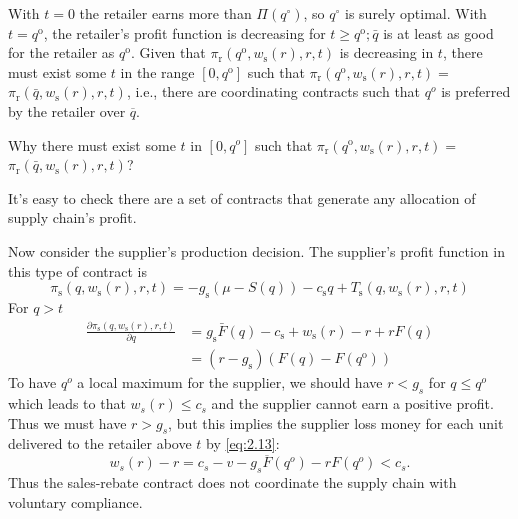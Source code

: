 With $t=0$ the retailer earns more than $\Pi\left(q^{\circ}\right)$, so $q^{\circ}$ is surely optimal. With $t=q^{\mathrm{o}}$, the retailer's profit function is decreasing for $t \geq q^{\mathrm{o}} ; \bar{q}$ is at least as good for the retailer as $q^{\mathrm{o}}$. Given that $\pi_{\mathrm{r}}\left(q^{\mathrm{o}}, w_{\mathrm{s}}(r), r, t\right)$ is decreasing in $t$, there must exist some $t$ in the range $\left[0, q^{\mathrm{o}}\right]$ such that $\pi_{\mathrm{r}}\left(q^{\mathrm{o}}, w_{\mathrm{s}}(r), r, t\right)=$ $\pi_{\mathrm{r}}\left(\bar{q}, w_{\mathrm{s}}(r), r, t\right)$, i.e., there are coordinating contracts such that $q^o$ is preferred by the retailer over $\overline{q}$.
\begin{note}
    Why there must exist some $t$ in $[0,q^o]$ such that $\pi_{\mathrm{r}}\left(q^{\mathrm{o}}, w_{\mathrm{s}}(r), r, t\right)=$ $\pi_{\mathrm{r}}\left(\bar{q}, w_{\mathrm{s}}(r), r, t\right)$?
\end{note}
\begin{note}
    It's easy to check there are a set of contracts that generate any allocation of supply chain's profit.
\end{note}
Now consider the supplier's production decision. The supplier's profit function in this type of contract is 
$$
\pi_{\mathrm{s}}\left(q, w_{\mathrm{s}}(r), r, t\right)=-g_{\mathrm{s}}(\mu-S(q))-c_{\mathrm{s}} q+T_{\mathrm{s}}\left(q, w_{\mathrm{s}}(r), r, t\right)
$$
For $q>t$
$$
\begin{aligned}
\frac{\partial \pi_{\mathrm{s}}\left(q, w_{\mathrm{s}}(r), r, t\right)}{\partial q} &=g_{\mathrm{s}} \bar{F}(q)-c_{\mathrm{s}}+w_{\mathrm{s}}(r)-r+r F(q) \\
&=\left(r-g_{\mathrm{s}}\right)\left(F(q)-F\left(q^{\mathrm{o}}\right)\right)
\end{aligned}
$$
To have $q^o$ a local maximum for the supplier, we should have $r<g_s$ for $q\leq q^o$ which leads to that $w_s(r)\leq c_s$ and the supplier cannot earn a positive profit. Thus we must have $r>g_s$, but this implies the supplier loss money for each unit delivered to the retailer above $t$ by \autoref{eq:2.13}:
\begin{equation*}
    w_s(r)-r=c_s-v-g_s\overline{F}(q^o)-rF(q^o)<c_s.
\end{equation*}
Thus the sales-rebate contract does not coordinate the supply chain with voluntary compliance.











